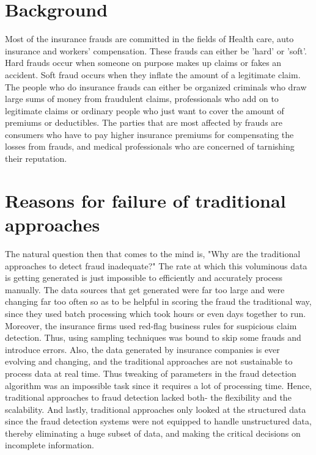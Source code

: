 \documentclass[sigconf]{acmart}
\begin{document}
\section{Background}
Most of the insurance frauds are committed in the fields of Health care, auto insurance and workers' compensation. These frauds can either be 'hard' or 'soft'. Hard frauds occur when someone on purpose makes up claims or fakes an accident. Soft fraud occurs when they inflate the amount of a legitimate claim. The people who do insurance frauds can either be organized criminals who draw large sums of money from fraudulent claims, professionals who add on to legitimate claims or ordinary people who just want to cover the amount of premiums or deductibles. The parties that are most affected by frauds are consumers who have to pay higher insurance premiums for compensating the losses from frauds, and medical professionals who are concerned of tarnishing their reputation.\cite{link6}


\section{Reasons for failure of traditional approaches}
The natural question then that comes to the mind is, "Why are the traditional approaches to detect fraud inadequate?" The rate at which this voluminous data is getting generated is just impossible to efficiently and accurately process manually. The data sources that get generated were far too large and were changing far too often so as to be helpful in scoring the fraud the traditional way, since they used batch processing which took hours or even days together to run. Moreover, the insurance firms used red-flag business rules for suspicious claim detection. Thus, using sampling techniques was bound to skip some frauds and introduce errors. Also, the data generated by insurance companies is ever evolving and changing, and the traditional approaches are not sustainable to process data at real time. Thus tweaking of parameters in the fraud detection algorithm was an impossible task since it requires a lot of processing time. Hence, traditional approaches to fraud detection lacked both- the flexibility and the scalability.\cite{link3} And lastly, traditional approaches only looked at the structured data since the fraud detection systems were not equipped to handle unstructured data, thereby eliminating a huge subset of data, and making the critical decisions on incomplete information.\cite{link5}
\end{document}
